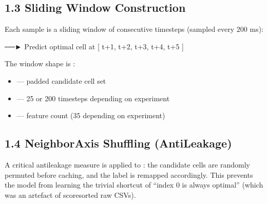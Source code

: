 \documentclass[letterpaper,10pt,english]{sphinxmanual}
\begin{document}
\subsection{1.3 Sliding Window Construction}
\label{\detokenize{training:sliding-window-construction}}
\sphinxAtStartPar
Each sample is a sliding window of  consecutive timesteps (sampled every 200 ms):

\begin{sphinxVerbatim}  ──►  Predict optimal cell at  [ t+1, t+2, t+3, t+4, t+5 ]
\end{sphinxVerbatim}

\sphinxAtStartPar
The window shape is :
\begin{itemize}
\item {} 
\sphinxAtStartPar
{} — padded candidate cell set

\item {} 
\sphinxAtStartPar
{} — 25 or 200 timesteps depending on experiment

\item {} 
\sphinxAtStartPar
{} — feature count (3\textendash{}5 depending on experiment)

\end{itemize}


\subsection{1.4 Neighbor\sphinxhyphen{}Axis Shuffling (Anti\sphinxhyphen{}Leakage)}
\label{\detokenize{training:neighbor-axis-shuffling-anti-leakage}}
\sphinxAtStartPar
A critical anti\sphinxhyphen{}leakage measure is applied to : the  candidate cells are randomly permuted before caching, and the label is remapped accordingly. This prevents the model from learning the trivial shortcut of “index 0 is always optimal” (which was an artefact of score\sphinxhyphen{}sorted raw CSVs).

\begin{sphinxVerbatim}[commandchars=\\\{\}]
   
      \PYG{p}{[}\PYG{p}{]}          
  \PYG{p}{[}\PYG{p}{]}  
\end{sphinxVerbatim}
\end{document}
